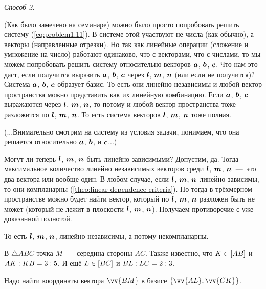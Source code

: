 \documentclass[a4paper,12pt]{article}
\begin{document}
\begin{solution}
    \bigskip
    
    \emph{Способ 2.}
    
    \medskip
    
    (Как было замечено на семинаре) можно было просто попробовать решить систему (\ref{eq:problem1.11}).
    В системе этой участвуют не числа (как обычно), а векторы (направленные отрезки).
    Но так как линейные операции (сложение и умножение на число) работают одинаково, что с векторами, что с числами, то мы можем попробовать решить систему относительно векторов $\boldsymbol a$, $\boldsymbol b$, $\boldsymbol c$.
    Что нам это даст, если получится выразить $\boldsymbol a$, $\boldsymbol b$, $\boldsymbol c$ через $\boldsymbol l$, $\boldsymbol m$, $\boldsymbol n$ (или если не получится)?
    Система $\boldsymbol a$, $\boldsymbol b$, $\boldsymbol c$ образует базис.
    То есть они линейно независимы и любой вектор пространства можно представить как их линейную комбинацию.
    Если $\boldsymbol a$, $\boldsymbol b$, $\boldsymbol c$ выражаются через $\boldsymbol l$, $\boldsymbol m$, $\boldsymbol n$, то потому и любой вектор пространства тоже разложится по $\boldsymbol l$, $\boldsymbol m$, $\boldsymbol n$.
    То есть система векторов $\boldsymbol l$, $\boldsymbol m$, $\boldsymbol n$ тоже полная.
    
    (...Внимательно смотрим на систему из условия задачи, понимаем, что она решается относительно $\boldsymbol a$, $\boldsymbol b$, и $\boldsymbol c$...)
    
    Могут ли теперь $\boldsymbol l$, $\boldsymbol m$, $\boldsymbol n$ быть линейно зависимыми?
    Допустим, да.
    Тогда максимальное количество линейно независимых векторов среди $\boldsymbol l$, $\boldsymbol m$, $\boldsymbol n$~---~это два вектора или вообще один.
    В любом случае, если $\boldsymbol l$, $\boldsymbol m$, $\boldsymbol n$ линейно зависимы, то они компланарны (\ref{theo:linear-dependence-criteria}).
    Но тогда в трёхмерном пространстве можно будет найти вектор, который по $\boldsymbol l$, $\boldsymbol m$, $\boldsymbol n$ разложен быть не может (который не лежит в плоскости $\boldsymbol l$, $\boldsymbol m$, $\boldsymbol n$).
    Получаем противоречие с уже доказанной полнотой.
    
    То есть $\boldsymbol l$, $\boldsymbol m$, $\boldsymbol n$, линейно независимы, а потому некомпланарны.
  \end{solution}
  
  
  \begin{problem}[1.21]
    В $\triangle ABC$ точка $M$~---~середина стороны $AC$.
    Также известно, что $K \hm\in [AB]$ и $AK \hm: KB \hm= 3 \hm: 5$.
    И ещё $L \hm\in [BC]$ и $BL \hm: LC \hm= 2 \hm: 3$.

    Надо найти координаты вектора $\vv{BM}$ в базисе $\{\vv{AL}, \vv{CK}\}$.
  \end{problem}
  
\end{document}

